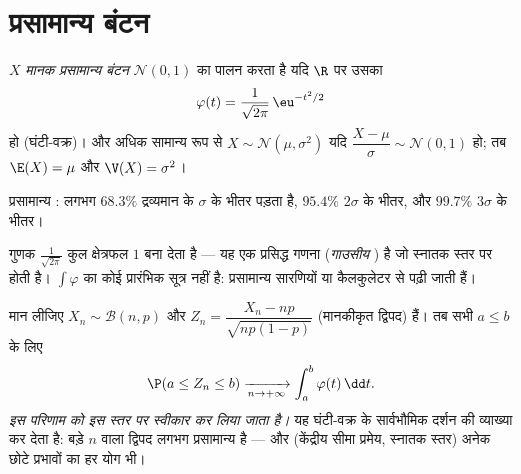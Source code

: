 \section{प्रसामान्य बंटन}

\begin{definition}[प्रसामान्य बंटन]\label{def:g12:contdist:normal}
$X$ \emph{मानक प्रसामान्य बंटन} $\mathcal N(0, 1)$ का पालन करता है
यदि $\R$ पर उसका 
\[
\varphi(t) = \frac{1}{\sqrt{2\pi}}\,\eu^{-t^2/2}
\]
हो (घंटी-वक्र)। और अधिक सामान्य रूप से $X \sim \mathcal N(\mu, \sigma^2)$ यदि $\dfrac{X - \mu}{\sigma} \sim
\mathcal N(0,1)$ हो; तब $\E(X) = \mu$ और $\V(X) = \sigma^2$।
\end{definition}

\begin{omfigure}

{\small प्रसामान्य : लगभग $68.3\%$ द्रव्यमान  के $\sigma$ के भीतर पड़ता है,
$95.4\%$ $2\sigma$ के भीतर, और $99.7\%$ $3\sigma$ के भीतर।}
\end{omfigure}

\begin{remark}
गुणक $\frac{1}{\sqrt{2\pi}}$ कुल क्षेत्रफल $1$ बना देता है --- यह एक प्रसिद्ध गणना
(\emph{गाउसीय }) है जो स्नातक स्तर पर होती है। $\int \varphi$ का कोई प्रारंभिक
सूत्र नहीं है: प्रसामान्य  सारणियों या कैलकुलेटर से पढ़ी जाती हैं।
\end{remark}

\begin{theorem}[दे म्वाव्र--लाप्लास, स्वीकृत]\label{thm:g12:contdist:tcl}
मान लीजिए $X_n \sim \mathcal B(n, p)$ और $Z_n = \dfrac{X_n - np}{\sqrt{np(1-p)}}$ (मानकीकृत द्विपद) हैं। तब सभी $a \leq b$ के लिए
\[
\P(a \leq Z_n \leq b) \xrightarrow[n\to+\infty]{}
\int_a^b \varphi(t)\,\dd t .
\]
\emph{इस परिणाम को इस स्तर पर स्वीकार कर लिया जाता है।} यह घंटी-वक्र के
सार्वभौमिक दर्शन की व्याख्या कर देता है: बड़े $n$ वाला द्विपद लगभग
प्रसामान्य है --- और (केंद्रीय सीमा प्रमेय, स्नातक स्तर) अनेक छोटे 
प्रभावों का हर योग भी।
\end{theorem}

